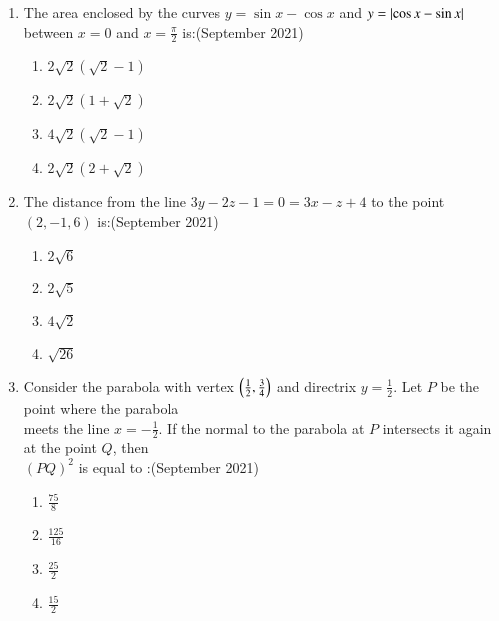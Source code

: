 \documentclass[journal,12pt,onecolumn]{IEEEtran}
\theoremstyle{remark}
\begin{document}
\begin{enumerate}
\item The area enclosed by the curves $y = \sin x - \cos x$ and $y = \left\vert\cos x - \sin x\right\vert$ between $x = 0$ and $x = \frac{\pi}{2}$ is:\hfill (September 2021)
\begin{multicols}{2}
\begin{enumerate}
    \item $2\sqrt{2}(\sqrt{2}-1)$\\
    \item $2\sqrt{2}(1+\sqrt{2})$
    \item $4\sqrt{2}(\sqrt{2}-1)$\\
    \item $2\sqrt{2}(2+\sqrt{2})$
\end{enumerate}
\end{multicols}
\item The distance from the line $3y - 2z - 1 = 0 = 3x - z + 4$ to the point $(2, -1, 6)$ is:\hfill (September 2021)
\begin{multicols}{2}
\begin{enumerate}
    \item $2\sqrt{6}$\\
    \item $2\sqrt{5}$
    \item $4\sqrt{2}$\\
    \item $\sqrt{26}$
\end{enumerate}
\end{multicols}

\item Consider the parabola with vertex $\left(\frac{1}{2}, \frac{3}{4}\right)$ and directrix $y = \frac{1}{2}$. Let $P$ be the point where the parabola\\ meets the line $x = -\frac{1}{2}$. If the normal to the parabola at $P$ intersects it again at the point $Q$, then\\ $(PQ)^2$ is equal to :\hfill (September 2021)
\begin{multicols}{2}
    \begin{enumerate}
    \item $\frac{75}{8}$\\
    \item $\frac{125}{16}$
    \item $\frac{25}{2}$\\
    \item $\frac{15}{2}$
\end{enumerate}
\end{multicols}



\end{enumerate}
\end{document}
